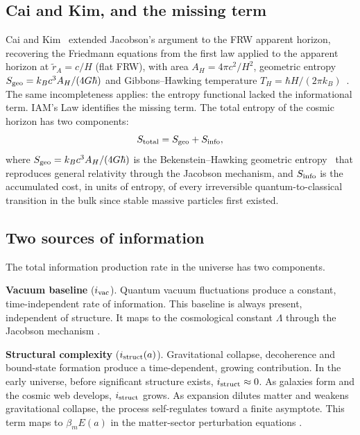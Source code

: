 \subsection{Cai and Kim, and the missing term}
Cai and Kim~\cite{CaiKim2005} extended Jacobson's argument to the FRW apparent horizon, recovering the Friedmann equations from the first law applied to the
apparent horizon at $\tilde r_A=c/H$ (flat FRW), with area $A_H=4\pi c^2/H^2$, geometric entropy $S_{\rm geo}=k_Bc^3A_H/(4G\hbar)$ and Gibbons--Hawking
temperature $T_H=\hbar H/(2\pi k_B)$~\cite{GibbonsHawking1977}. The same incompleteness applies: the entropy functional lacked the informational term. IAM's
Law identifies the missing term. The total entropy of the cosmic horizon has two components:
\begin{equation}
S_{\rm total}=S_{\rm geo}+S_{\rm info}, \label{eq:law_Stotal}
\end{equation}
where $S_{\rm geo}=k_Bc^3A_H/(4G\hbar)$ is the Bekenstein--Hawking geometric entropy~\cite{Bekenstein1973,Hawking1975} that reproduces general relativity
through the Jacobson mechanism, and $S_{\rm info}$ is the accumulated cost, in units of entropy, of every irreversible quantum-to-classical transition in
the bulk since stable massive particles first existed. \conjecture{}

\subsection{Two sources of information}
The total information production rate in the universe has two components.

\textbf{Vacuum baseline} ($i_{\rm vac}$). Quantum vacuum fluctuations produce a constant, time-independent rate of information. This baseline is always
present, independent of structure. It maps to the cosmological constant $\Lambda$ through the Jacobson mechanism \conjecture.

\textbf{Structural complexity} ($i_{\rm struct}(a)$). Gravitational collapse, decoherence and bound-state formation produce a time-dependent, growing
contribution. In the early universe, before significant structure exists, $i_{\rm struct}\approx0$. As galaxies form and the cosmic web develops,
$i_{\rm struct}$ grows. As expansion dilutes matter and weakens gravitational collapse, the process self-regulates toward a finite asymptote. This term
maps to $\beta_mE(a)$ in the matter-sector perturbation equations \conjecture.

